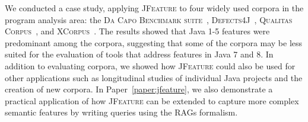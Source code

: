 We conducted a case study, applying \textsc{JFeature} to four widely used corpora in the
program analysis area: the \textsc{Da Capo Benchmark suite}~\cite{DaCapo:paper}, \textsc{Defects4J}~\cite{just2014defects4j},
\textsc{Qualitas Corpus}~\cite{QualitasCorpus:APSEC:2010}, and \textsc{XCorpus}~\cite{dietrich2017xcorpus}.
The results showed that Java 1-5 features were predominant among the corpora,
suggesting that some of the corpora may be less suited for the evaluation of
tools that address features in Java 7 and 8.
In addition to evaluating corpora, we showed how \textsc{JFeature} could also be used for other
applications such as longitudinal studies of individual Java projects and the creation
of new corpora. In Paper~\ref{paper:jfeature}, we also demonstrate a practical application of how \textsc{JFeature} can
be extended to capture more complex semantic features by writing queries using the RAGs formalism.



